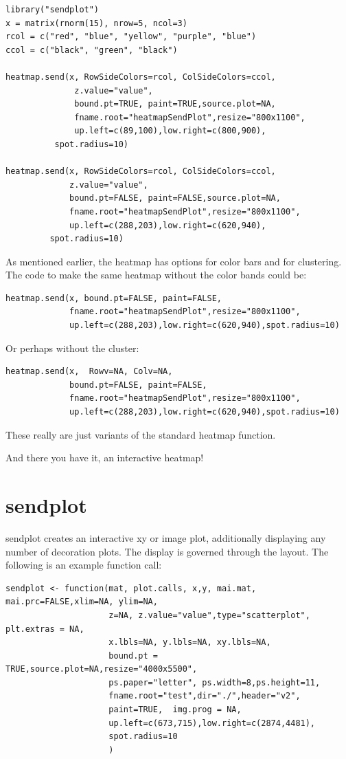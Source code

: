 \documentclass[]{article}
\begin{document}
\begin{verbatim}
library("sendplot")
x = matrix(rnorm(15), nrow=5, ncol=3)
rcol = c("red", "blue", "yellow", "purple", "blue")
ccol = c("black", "green", "black")

heatmap.send(x, RowSideColors=rcol, ColSideColors=ccol,
              z.value="value",
              bound.pt=TRUE, paint=TRUE,source.plot=NA,
              fname.root="heatmapSendPlot",resize="800x1100",
              up.left=c(89,100),low.right=c(800,900),
	      spot.radius=10)

heatmap.send(x, RowSideColors=rcol, ColSideColors=ccol,
             z.value="value",
             bound.pt=FALSE, paint=FALSE,source.plot=NA,
             fname.root="heatmapSendPlot",resize="800x1100",
             up.left=c(288,203),low.right=c(620,940),
	     spot.radius=10)

\end{verbatim}

As mentioned earlier, the heatmap has options for color bars and for clustering. The code to make the same heatmap without the color bands could be:

\begin{verbatim}
heatmap.send(x, bound.pt=FALSE, paint=FALSE, 
             fname.root="heatmapSendPlot",resize="800x1100",
             up.left=c(288,203),low.right=c(620,940),spot.radius=10)
\end{verbatim}

Or perhaps without the cluster:

\begin{verbatim}
heatmap.send(x,  Rowv=NA, Colv=NA, 
             bound.pt=FALSE, paint=FALSE, 
             fname.root="heatmapSendPlot",resize="800x1100",
             up.left=c(288,203),low.right=c(620,940),spot.radius=10)
\end{verbatim}

These really are just variants of the standard heatmap function. 


And there you have it, an interactive heatmap! 



\newpage


\section{sendplot}

\indent sendplot creates an interactive xy or image plot, additionally displaying any number of decoration plots. The display is governed through the layout. The following is an example function call:
\begin{verbatim}
sendplot <- function(mat, plot.calls, x,y, mai.mat, mai.prc=FALSE,xlim=NA, ylim=NA,
                     z=NA, z.value="value",type="scatterplot", plt.extras = NA,
                     x.lbls=NA, y.lbls=NA, xy.lbls=NA,
                     bound.pt = TRUE,source.plot=NA,resize="4000x5500", 
                     ps.paper="letter", ps.width=8,ps.height=11,
                     fname.root="test",dir="./",header="v2",
                     paint=TRUE,  img.prog = NA,
                     up.left=c(673,715),low.right=c(2874,4481),
                     spot.radius=10
                     )
\end{verbatim}
\end{document}
